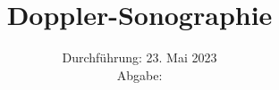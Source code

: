

\subject{\texorpdfstring{\vspace{2ex}}{}US3\texorpdfstring{\vspace{-2ex}}{}} %
\title{Doppler-Sonographie} %
\date{
	Durchführung: 23. Mai 2023 %
	\\ Abgabe:%
}




\maketitle
\thispagestyle{empty}


\tableofcontents
\newpage







\printbibliography{}

\newpage



